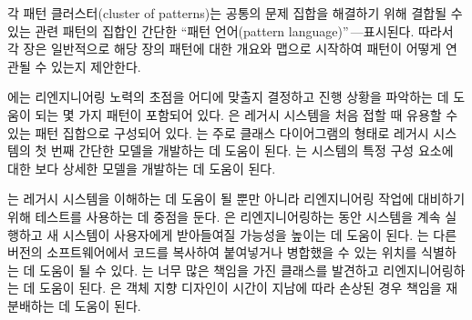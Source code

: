 \documentclass[a4paper,10pt,twoside]{book}
\begin{document}
각 패턴 클러스터(cluster of patterns)는 공통의 문제 집합을 해결하기 위해 결합될 수 있는 관련 패턴의 집합인 간단한 ``패턴 언어(pattern language)''\,---\로 표시된다. 따라서 각 장은 일반적으로 해당 장의 패턴에 대한 개요와 맵으로 시작하여 패턴이 어떻게 연관될 수 있는지 제안한다.


에는 리엔지니어링 노력의 초점을 어디에 맞출지 결정하고 진행 상황을 파악하는 데 도움이 되는 몇 가지 패턴이 포함되어 있다. 은 레거시 시스템을 처음 접할 때 유용할 수 있는 패턴 집합으로 구성되어 있다. 는 주로 클래스 다이어그램의 형태로 레거시 시스템의 첫 번째 간단한 모델을 개발하는 데 도움이 된다. 는 시스템의 특정 구성 요소에 대한 보다 상세한 모델을 개발하는 데 도움이 된다.

는 레거시 시스템을 이해하는 데 도움이 될 뿐만 아니라 리엔지니어링 작업에 대비하기 위해 테스트를 사용하는 데 중점을 둔다. 은 리엔지니어링하는 동안 시스템을 계속 실행하고 새 시스템이 사용자에게 받아들여질 가능성을 높이는 데 도움이 된다. 는 다른 버전의 소프트웨어에서 코드를 복사하여 붙여넣거나 병합했을 수 있는 위치를 식별하는 데 도움이 될 수 있다. 는 너무 많은 책임을 가진 클래스를 발견하고 리엔지니어링하는 데 도움이 된다. 은 객체 지향 디자인이 시간이 지남에 따라 손상된 경우 책임을 재분배하는 데 도움이 된다.

\ifx\wholebook\relax\else
   
   
   
\end{document}
